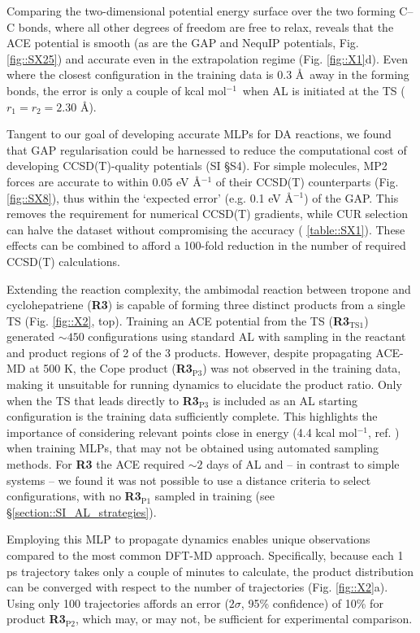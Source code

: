\documentclass[twoside,twocolumn,9pt]{article}
\newcommand{\kcal}{kcal mol$^{-1}$}
\begin{document}
Comparing the two-dimensional potential energy surface over the two forming C–C bonds, where all other degrees of freedom are free to relax, reveals that the ACE potential is smooth (as are the GAP and NequIP potentials, Fig. \ref{fig::SX25}) and accurate even in the extrapolation regime (Fig. \ref{fig::X1}d). Even where the closest configuration in the training data is 0.3 \AA~away in the forming bonds, the error is only a couple of \kcal~when AL is initiated at the TS ($r_1=r_2=2.30$ \AA).


Tangent to our goal of developing accurate MLPs for DA reactions, we found that GAP regularisation could be harnessed to reduce the computational cost of developing CCSD(T)-quality potentials (SI §S4). For simple molecules, MP2 forces are accurate to within $0.05$ eV \AA${}^{-1}$ of their CCSD(T) counterparts (Fig. \ref{fig::SX8}), thus within the `expected error’ (e.g. 0.1 eV \AA${}^{-1}$) of the GAP. This removes the requirement for numerical CCSD(T) gradients, while CUR\cite{Mahoney2009} selection can halve the dataset without compromising the accuracy (\tablename{ \ref{table::SX1}}). These effects can be combined to afford a 100-fold reduction in the number of required CCSD(T) calculations.


Extending the reaction complexity, the ambimodal reaction between tropone and cyclohepatriene ({\bfseries{R3}}) is capable of forming three distinct products from a single TS (Fig. \ref{fig::X2}, top).\cite{Jamieson2021} Training an ACE potential from the TS ({\bfseries{R3$_\text{TS1}$}}) generated $\sim450$ configurations using standard AL with sampling in the reactant and product regions of 2 of the 3 products. However, despite propagating ACE-MD at 500 K, the Cope product ({\bfseries{R3$_\text{P3}$}}) was not observed in the training data, making it unsuitable for running dynamics to elucidate the product ratio. Only when the TS that leads directly to {\bfseries{R3$_\text{P3}$}} is included as an AL starting configuration is the training data sufficiently complete. This highlights the importance of considering relevant points close in energy (4.4 \kcal, ref. ) when training MLPs, that may not be obtained using automated sampling methods. For {\bfseries{R3}} the ACE required $\sim 2$ days of AL and -- in contrast to simple systems -- we found it was not possible to use a distance criteria to select configurations, with no {\bfseries{R3$_\text{P1}$}} sampled in training (see §\ref{section::SI_AL_strategies}).


Employing this MLP to propagate dynamics enables unique observations compared to the most common DFT-MD approach. Specifically, because each 1 ps trajectory takes only a couple of minutes to calculate, the product distribution can be converged with respect to the number of trajectories (Fig. \ref{fig::X2}a). Using only 100 trajectories affords an error ($2\sigma$, 95\% confidence) of 10\% for product {\bfseries{R3$_\text{P2}$}}, which may, or may not, be sufficient for experimental comparison.
\end{document}
